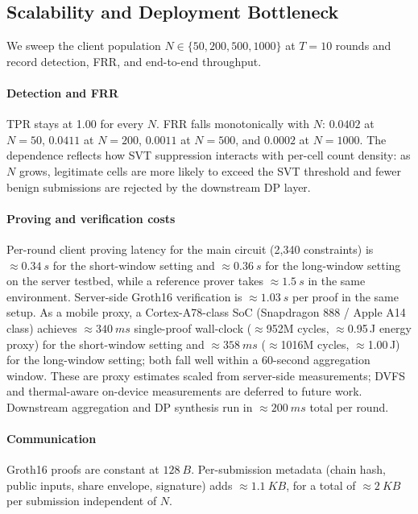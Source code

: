 \documentclass[conference]{IEEEtran}
\theoremstyle{definition}
\theoremstyle{plain}
\begin{document}
\subsection{Scalability and Deployment Bottleneck}
\label{sec:eval-scale}

We sweep the client population $N \in \{50, 200, 500, 1000\}$ at
$T{=}10$ rounds and record detection, FRR, and end-to-end throughput.

\paragraph{Detection and FRR}
TPR stays at 1.00 for every $N$. FRR falls monotonically with $N$:
$0.0402$ at $N{=}50$, $0.0411$ at $N{=}200$, $0.0011$ at $N{=}500$, and
$0.0002$ at $N{=}1000$. The dependence reflects how SVT suppression
interacts with per-cell count density: as $N$ grows, legitimate cells
are more likely to exceed the SVT threshold and fewer benign
submissions are rejected by the downstream DP layer.

\paragraph{Proving and verification costs}
Per-round client proving latency for the main circuit (2,340 constraints) is
$\approx\SI{0.34}{s}$ for the short-window setting and $\approx\SI{0.36}{s}$
for the long-window setting on the server testbed, while a reference prover
takes $\approx\SI{1.5}{s}$ in the same environment.
Server-side Groth16 verification is $\approx\SI{1.03}{s}$ per proof in the
same setup.
As a mobile proxy, a Cortex-A78-class SoC (Snapdragon 888 / Apple A14 class)
achieves $\approx\SI{340}{ms}$ single-proof wall-clock
($\approx$952M cycles, $\approx$0.95\,J energy proxy) for the short-window
setting and $\approx\SI{358}{ms}$ ($\approx$1016M cycles, $\approx$1.00\,J)
for the long-window setting; both fall well within a 60-second aggregation
window.
These are proxy estimates scaled from server-side measurements;
DVFS and thermal-aware on-device measurements are deferred to future work.
Downstream aggregation and DP synthesis run in $\approx\SI{200}{ms}$ total per round.

\paragraph{Communication}
Groth16 proofs are constant at $\SI{128}{B}$. Per-submission metadata
(chain hash, public inputs, share envelope, signature) adds
$\approx\SI{1.1}{KB}$, for a total of $\approx\SI{2}{KB}$ per submission
independent of $N$.
\end{document}
